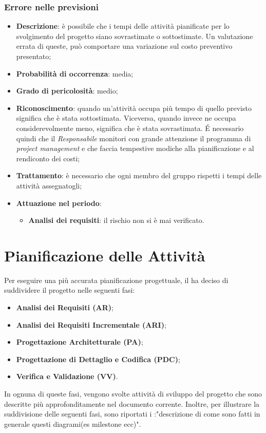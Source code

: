 		\subsubsection{Errore nelle previsioni}
		\begin{itemize}
			\item \textbf{Descrizione}: è possibile che i tempi delle attività pianificate per lo svolgimento del progetto siano sovrastimate o sottostimate. Un valutazione errata di queste, può comportare una variazione sul costo preventivo presentato; 
			\item \textbf{Probabilità di occorrenza}: media;
			\item \textbf{Grado di pericolosità}: medio;
			\item \textbf{Riconoscimento}: quando un'attività occupa più tempo di quello previsto significa che è stata sottostimata. Viceversa, quando invece ne occupa considerevolmente meno, significa che è stata sovrastimata. É necessario quindi che il \emph{Responsabile} monitori con grande attenzione il programma di \emph{project management} e che faccia tempestive modiche alla pianificazione e al rendiconto dei costi; 
			\item \textbf{Trattamento}: è necessario che ogni membro del gruppo rispetti i tempi delle attività assegnatogli; 
			\item \textbf{Attuazione nel periodo}:
			\begin{itemize}
				\item \textbf{Analisi dei requisiti}:  il rischio non si è mai verificato.
			\end{itemize}
		\end{itemize}
\section{Pianificazione delle Attività}
Per eseguire una più accurata pianificazione progettuale, il  ha deciso di suddividere il progetto nelle seguenti fasi:
\begin{itemize}
	\item \textbf{Analisi dei Requisiti (AR)};
	\item \textbf{Analisi dei Requisiti Incrementale (ARI)};
	\item \textbf{Progettazione Architetturale (PA)};
	\item \textbf{Progettazione di Dettaglio e Codifica (PDC)};
	\item \textbf{Verifica e Validazione (VV)}.
\end{itemize}
In ognuna di queste fasi, vengono svolte attività di sviluppo del progetto che sono descritte più approfonditamente nel documento corrente.
Inoltre, per illustrare la suddivisione delle seguenti fasi, sono riportati i :"descrizione di come sono fatti in generale 
questi diagrami(es milestone ecc)".
